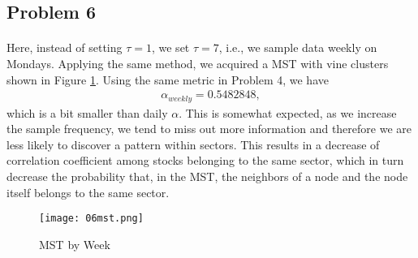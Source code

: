 \subsection*{Problem 6}
\paragraph{}
Here, instead of setting $\tau = 1$, we set $\tau=7$, i.e., we sample data weekly on Mondays. Applying the same method, we acquired a MST with vine clusters shown in Figure \ref{fig:06mst}. Using the same metric in Problem 4, we have 
\begin{align*}
\alpha_{weekly} = 0.5482848,
\end{align*}
which is a bit smaller than daily $\alpha$. This is somewhat expected, as we increase the sample frequency, we tend to miss out more information and therefore we are less likely to discover a pattern within sectors. This results in a decrease of correlation coefficient among stocks belonging to the same sector, which in turn decrease the probability that, in the MST, the neighbors of a node and the node itself belongs to the same sector.

\begin{figure}[H]
	\centering
	\texttt{[image: 06mst.png]}
	\caption{MST by Week}	
	\label{fig:06mst} 
\end{figure}

